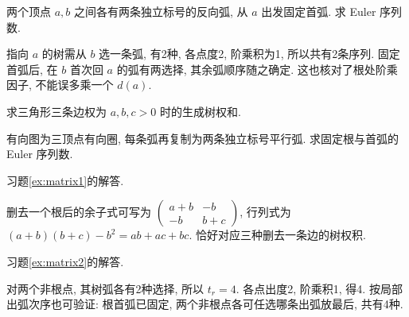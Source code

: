 \begin{example}
两个顶点 $a,b$ 之间各有两条独立标号的反向弧, 从 $a$ 出发固定首弧. 求 Euler 序列数.
\end{example}
\begin{solution}
指向 $a$ 的树需从 $b$ 选一条弧, 有2种, 各点度2, 阶乘积为1, 所以共有2条序列. 固定首弧后, 在 $b$ 首次回 $a$ 的弧有两选择, 其余弧顺序随之确定. 这也核对了根处阶乘因子, 不能误多乘一个 $d(a)$.
\end{solution}
\begin{exercise}\label{ex:matrix1}
求三角形三条边权为 $a,b,c>0$ 时的生成树权和.
\end{exercise}
\begin{exercise}\label{ex:matrix2}
有向图为三顶点有向圈, 每条弧再复制为两条独立标号平行弧. 求固定根与首弧的 Euler 序列数.
\end{exercise}
习题\ref{ex:matrix1}的解答.
\begin{solution}
删去一个根后的余子式可写为 $\left(\begin{smallmatrix}a+b&-b\\-b&b+c\end{smallmatrix}\right)$, 行列式为 $(a+b)(b+c)-b^2=ab+ac+bc$. 恰好对应三种删去一条边的树权积.
\end{solution}
习题\ref{ex:matrix2}的解答.
\begin{solution}
对两个非根点, 其树弧各有2种选择, 所以 $t_r=4$. 各点出度2, 阶乘积1, 得4. 按局部出弧次序也可验证: 根首弧已固定, 两个非根点各可任选哪条出弧放最后, 共有4种.
\end{solution}
